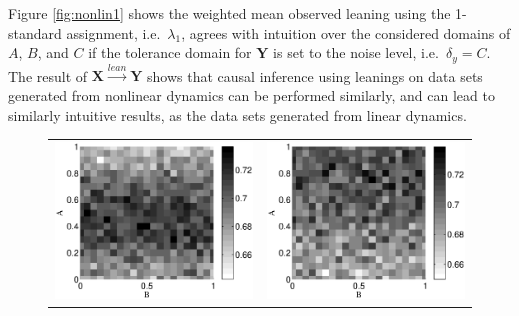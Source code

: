 \documentclass[twocolumn,aps,pre,groupedaddress]{revtex4-1}
\begin{document}
Figure \ref{fig:nonlin1} shows the weighted mean observed leaning using the 1-standard assignment, i.e.\ $\lambda_1$, agrees with intuition over the considered domains of $A$, $B$, and $C$ if the tolerance domain for $\mathbf{Y}$ is set to the noise level, i.e.\ $\delta_y = C$.  The result of $\mathbf{X}\xrightarrow{lean}\mathbf{Y}$ shows that causal inference using leanings on data sets generated from nonlinear dynamics can be performed similarly, and can lead to similarly intuitive results, as the data sets generated from linear dynamics.
\begin{figure}[ht]
\begin{tabular}{cc}
\includegraphics[scale=0.30]{NonlinearCyclicexample_BxytolC02.eps} &
\includegraphics[scale=0.30]{NonlinearCyclicexample_BxytolC04.eps} \\

\end{tabular}
\end{figure}
\end{document}

